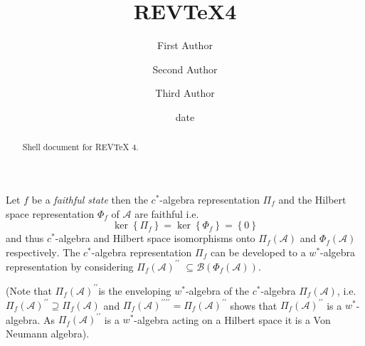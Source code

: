 \documentclass[aps,preprint]{revtex4}%
\begin{document}
\title[Short title for running header]{REV\TeX4}
\author{First Author}
\author{Second Author}
\author{Third Author}

\begin{abstract}
Shell document for REV\TeX{} 4.

\end{abstract}
\date[Date text]{date}




\maketitle
\tableofcontents


\section{}



Let $f$ be a \emph{faithful state} then the $c^{\ast}$-algebra representation
$\Pi_{f}$ and the Hilbert space representation $\Phi_{f}$ of $\mathcal{A}$ are
faithful i.e.
\begin{equation}
\ker\left\{  \Pi_{f}\right\}  =\ker\left\{  \Phi_{f}\right\}  =\left\{
0\right\}
\end{equation}
and thus $c^{\ast}$-algebra and Hilbert space isomorphisms onto $\Pi
_{f}\left(  \mathcal{A}\right)  $ and $\Phi_{f}\left(  \mathcal{A}\right)  $
respectively$.$ The $c^{\ast}$-algebra representation $\Pi_{f}$ can be
developed to a $w^{\ast}$-algebra representation by considering $\Pi
_{f}\left(  \mathcal{A}\right)  ^{\prime\prime}$ $\subseteq\mathcal{B}\left(
\Phi_{f}\left(  \mathcal{A}\right)  \right)  .$

(Note that $\Pi_{f}\left(  \mathcal{A}\right)  ^{\prime\prime}$is the
enveloping $w^{\ast}$-algebra of the $c^{\ast}$-algebra $\Pi_{f}\left(
\mathcal{A}\right)  $, i.e. $\Pi_{f}\left(  \mathcal{A}\right)  ^{\prime
\prime}\supseteq\Pi_{f}\left(  \mathcal{A}\right)  $ and $\Pi_{f}\left(
\mathcal{A}\right)  ^{\prime\prime\prime\prime}=\Pi_{f}\left(  \mathcal{A}%
\right)  ^{\prime\prime}$ shows that $\Pi_{f}\left(  \mathcal{A}\right)
^{\prime\prime}$ is a $w^{\ast}$-algebra. As $\Pi_{f}\left(  \mathcal{A}%
\right)  ^{\prime\prime}$ is a $w^{\ast}$-algebra acting on a Hilbert space it
is a Von Neumann algebra).
\end{document}
